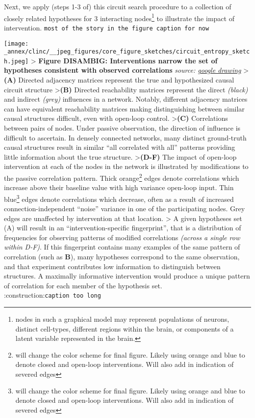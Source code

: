 Next, we apply (steps 1-3 of) this circuit search procedure to a
collection of closely related hypotheses for 3 interacting
nodes\footnote{nodes in such a graphical model may represent populations
  of neurons, distinct cell-types, different regions within the brain,
  or components of a latent variable represented in the brain.} to
illustrate the impact of intervention. 
\texttt{most\ of\ the\ story\ in\ the\ figure\ caption\ for\ now} 

\texttt{[image: \_annex/clinc/\_\_jpeg\_figures/core\_figure\_sketches/circuit\_entropy\_sketch.jpeg]}
\textgreater{} \textbf{Figure DISAMBIG: Interventions narrow the set of
hypotheses consistent with observed correlations} \emph{source:
\href{https://docs.google.com/drawings/d/1CBp1MhOW7OGNuBvo7OkIuzqnq8kmN8EEX_AkFuKpVtM/edit}{google
drawing}} \textgreater{}\textbf{(A)} Directed adjacency matrices
represent the true and hypothesized causal circuit structure
\textgreater{}\textbf{(B)} Directed reachability matrices represent the
direct \emph{(black)} and indirect \emph{(grey)} influences in a
network. Notably, different adjacency matrices can have equivalent
reachability matrices making distinguishing between similar causal
structures difficult, even with open-loop control.
\textgreater{}\textbf{(C)} Correlations between pairs of nodes. Under
passive observation, the direction of influence is difficult to
ascertain. In densely connected networks, many distinct ground-truth
causal structures result in similar ``all correlated with all'' patterns
providing little information about the true structure.
\textgreater{}\textbf{(D-F)} The impact of open-loop intervention at
each of the nodes in the network is illustrated by modifications to the
passive correlation pattern. Thick orange\footnote{will change the color
  scheme for final figure. Likely using orange and blue to denote closed
  and open-loop interventions. Will also add in indication of severed
  edges} edges denote correlations which increase above their baseline
value with high variance open-loop input. Thin blue\footnote{will change
  the color scheme for final figure. Likely using orange and blue to
  denote closed and open-loop interventions. Will also add in indication
  of severed edges} edges denote correlations which decrease, often as a
result of increased connection-independent ``noise'' variance in one of
the participating nodes. Grey edges are unaffected by intervention at
that location. \textgreater{} A given hypotheses set (A) will result in
an ``intervention-specific fingerprint'', that is a distribution of
frequencies for observing patterns of modified correlations
\emph{(across a single row within D-F)}. If this fingerprint contains
many examples of the same pattern of correlation (such as \textbf{B}),
many hypotheses correspond to the same observation, and that experiment
contributes low information to distinguish between structures. A
maximally informative intervention would produce a unique pattern of
correlation for each member of the hypothesis set.
:construction:\texttt{caption\ too\ long}

